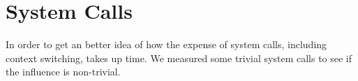 \section{System Calls}

In order to get an better idea of how the expense of system calls, including context switching, takes up time. We measured some trivial system calls to see if the influence is non-trivial.